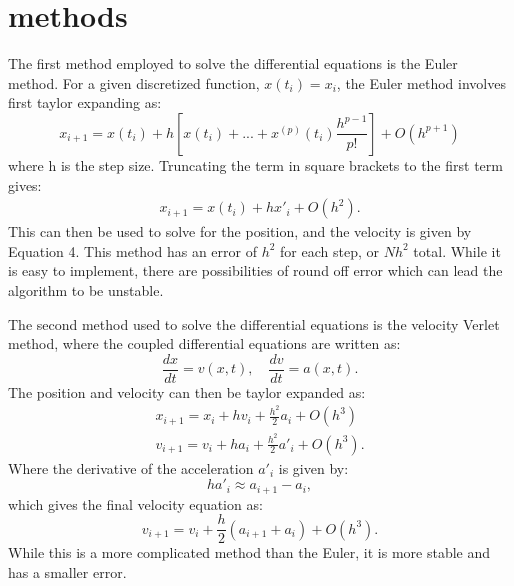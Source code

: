 \documentclass[prc,amsmath,twocolumn,superscriptaddress]{revtex4}
\begin{document}
\section{methods}
\label{methods}

The first method employed to solve the differential equations is the Euler method. For a given discretized function, $x(t_i)=x_i$, the Euler method involves first taylor expanding as:
\begin{equation}
x_{i+1}= x(t_i)+h\left[x (t_i)+ ... + x^{(p)}(t_i)\frac{h^{p-1}}{p!}\right] + O(h^{p+1})
\end{equation}
where h is the step size. Truncating the term in square brackets to the first term gives:
\begin{gather}
x_{i+1}= x(t_i)+hx'_i+O(h^2).
\end{gather}
This can then be used to solve for the position, and the velocity is given by Equation 4. This method has an error of $h^2$ for each step, or $Nh^2$ total. While it is easy to implement, there are possibilities of round off error which can lead the algorithm to be unstable.

The second method used to solve the differential equations is the velocity Verlet method, where the coupled differential equations are written as:
\begin{equation}
\frac{dx}{dt}=v(x,t), \quad \frac{dv}{dt}=a(x,t).
\end{equation}
The position and velocity can then be taylor expanded as:
\begin{gather}
x_{i+1}=x_i+hv_i+\frac{h^2}{2}a_i+O(h^3) \\
v_{i+1}=v_i+ha_i+\frac{h^2}{2}a'_i+O(h^3).
\end{gather}
Where the derivative of the acceleration $a'_i$ is given by:
\begin{equation}
ha'_i\approx a_{i+1}-a_i,
\end{equation}
which gives the final velocity equation as:
\begin{equation}
v_{i+1}=v_i+\frac{h}{2}\left(a_{i+1}+a_i \right) +O(h^3).
\end{equation}
While this is a more complicated method than the Euler, it is more stable and has a smaller error.
\end{document}
